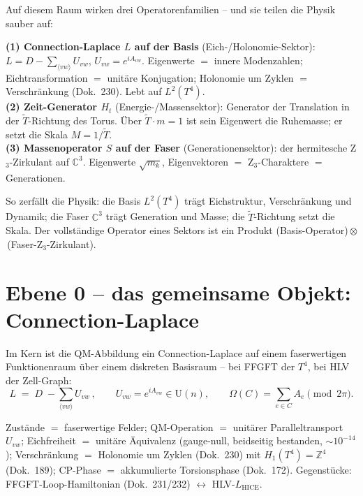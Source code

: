 Auf diesem Raum wirken drei Operatorenfamilien -- und sie teilen die Physik
sauber auf:

\begin{technical}
\textbf{(1) Connection-Laplace $L$ auf der Basis} (Eich-/Holonomie-Sektor):
$L=D-\sum_{\langle vw\rangle}U_{vw}$, $U_{vw}=e^{iA_{vw}}$. Eigenwerte $=$ innere
Modenzahlen; Eichtransformation $=$ unitäre Konjugation; Holonomie um Zyklen
$=$ Verschränkung (Dok.~230). Lebt auf $L^2(T^4)$.\\[2pt]
\textbf{(2) Zeit-Generator $H_t$} (Energie-/Massensektor): Generator der
Translation in der $\tilde T$-Richtung des Torus. Über $\tilde T\cdot m=1$ ist
sein Eigenwert die Ruhemasse; er setzt die Skala $M=1/\tilde T$.\\[2pt]
\textbf{(3) Massenoperator $S$ auf der Faser} (Generationensektor): der
hermitesche Z$_3$-Zirkulant auf $\mathbb{C}^3$. Eigenwerte $\sqrt{m_k}$,
Eigenvektoren $=$ Z$_3$-Charaktere $=$ Generationen.
\end{technical}

So zerfällt die Physik: die Basis $L^2(T^4)$ trägt Eichstruktur, Verschränkung
und Dynamik; die Faser $\mathbb{C}^3$ trägt Generation und Masse; die
$\tilde T$-Richtung setzt die Skala. Der vollständige Operator eines Sektors ist
ein Produkt (Basis-Operator)\,$\otimes$\,(Faser-Z$_3$-Zirkulant).

\section{Ebene 0 -- das gemeinsame Objekt: Connection-Laplace}

Im Kern ist die QM-Abbildung ein Connection-Laplace auf einem faserwertigen
Funktionenraum über einem diskreten Basisraum -- bei FFGFT der $T^4$, bei HLV
der Zell-Graph:
\begin{equation}
  L \;=\; D \;-\!\!\sum_{\langle vw\rangle} U_{vw}\,,
  \qquad U_{vw}=e^{iA_{vw}}\in \mathrm{U}(n),
  \qquad \Omega(C)=\textstyle\sum_{e\in C}A_e \pmod{2\pi}.
\end{equation}

\begin{keyresult}
Zustände $=$ faserwertige Felder; QM-Operation $=$ unitärer Paralleltransport
$U_{vw}$; Eichfreiheit $=$ unitäre Äquivalenz (gauge-null, beidseitig bestanden,
$\sim10^{-14}$); Verschränkung $=$ Holonomie um Zyklen (Dok.~230) mit
$H_1(T^4)=\mathbb{Z}^4$ (Dok.~189); CP-Phase $=$ akkumulierte Torsionsphase
(Dok.~172). Gegenstücke: FFGFT-Loop-Hamiltonian (Dok.~231/232)
$\leftrightarrow$ HLV-$L_{\mathrm{HICE}}$.
\end{keyresult}

